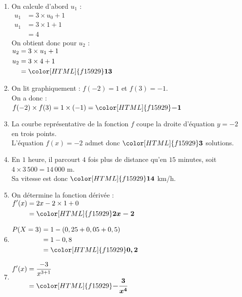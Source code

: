 \documentclass[a4paper,11pt,landscape,exos]{nsi} %
\begin{document}
\begin{multicols}{2}
\begin{enumerate}[]
\item On calcule d'abord $u_1$ : \\   
      $\begin{aligned}
      u_1&=3\times u_0 +1\\
      u_1&=3\times 1 +1\\
      &=4     
      \end{aligned}$\\
      On obtient donc pour $u_2$ :\\
      $\begin{aligned}
      u_2&=3\times u_1 +1\\
      u_2&=3\times 4 +1\\
      &={\color[HTML]{f15929}\boldsymbol{13}}     
      \end{aligned}$
\item On lit graphiquement : $f(-2)=1$ et $f(3)=-1$.\\
      On a donc :\\
      $f(-2)\times f(3)=1\times (-1)={\color[HTML]{f15929}\boldsymbol{-1}}$
    
\item  La courbe représentative de la fonction $f$ coupe la droite d'équation $y=-2$ en trois points.\\
      L'équation $f(x)=-2$ admet donc ${\color[HTML]{f15929}\boldsymbol{3}}$ solutions.
\item En $1$ heure, il parcourt $4$ fois plus de distance  qu'en $15$ minutes, soit $4\times 3\,500=
      14\,000$ m.\\
      Sa vitesse est donc ${\color[HTML]{f15929}\boldsymbol{14}}$ km/h.
\item  On détermine la fonction dérivée :\\
      $\begin{aligned}
      f'(x)&= 2x -2\times 1 +0\\
      &={\color[HTML]{f15929}\boldsymbol{2x-2}}     
      \end{aligned}$
\item  
    $\begin{aligned}
      P(X=3) &=1-(0,25+0,05+0,5)\\
      &=1-0,8\\
      &={\color[HTML]{f15929}\boldsymbol{0,2}}
      \end{aligned}$
      
\item  
    $\begin{aligned}
  f'(x)&=\dfrac{-3}{x^{3+1}}\\
  &={\color[HTML]{f15929}\boldsymbol{-\dfrac{3}{x^4}}}
  \end{aligned}$


\end{enumerate}
\end{multicols}
\end{document}
